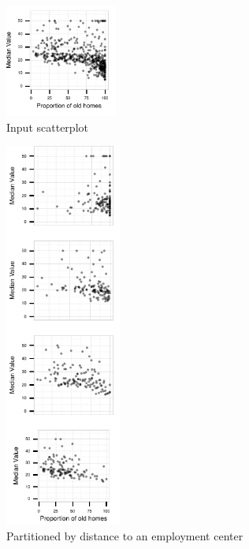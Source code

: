 
\begin{figure}
 \centering 
    \begin{subfigure}[t]{1.45in}
        \includegraphics[width=1.45in]{images/AGE-MEDV.pdf}
        \caption{Input scatterplot}
        \label{fig:method_original}
    \end{subfigure}
    \begin{subfigure}[t]{1.5in}
  	\includegraphics[width=1.5in]{images/DIS.pdf}
	\caption{Partitioned by distance to an employment center}
	 \label{fig:method_actual}
    \end{subfigure}
    \begin{subfigure}[t]{1.5in}

\end{subfigure}
\end{figure}
